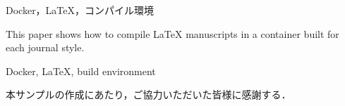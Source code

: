 \documentclass[paper]{style/ieicej}
\begin{document}
\begin{abstract}
本稿では，学会スタイルごとにDockerイメージを作成し，
\LaTeX{}原稿をコンテナ内でコンパイルする方法を示す．
\end{abstract}
\begin{keyword}
Docker，\LaTeX{}，コンパイル環境
\end{keyword}
\begin{eabstract}
This paper shows how to compile \LaTeX{} manuscripts in a container
built for each journal style.
\end{eabstract}
\begin{ekeyword}
Docker, \LaTeX{}, build environment
\end{ekeyword}
\maketitle




\ack
本サンプルの作成にあたり，ご協力いただいた皆様に感謝する．



\end{document}
